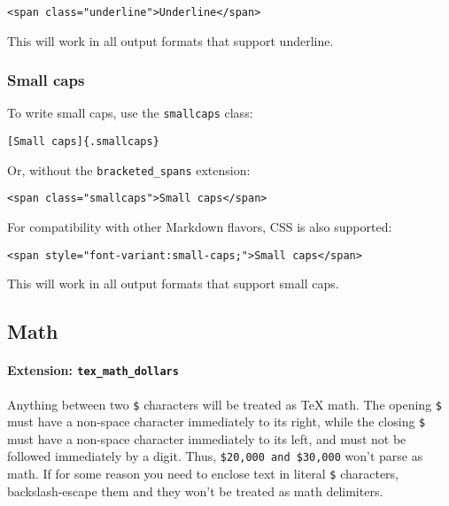 \begin{verbatim}
<span class="underline">Underline</span>
\end{verbatim}

This will work in all output formats that support underline.

\hypertarget{small-caps}{%
\subsubsection{Small caps}\label{small-caps}}

To write small caps, use the \texttt{smallcaps} class:

\begin{verbatim}
[Small caps]{.smallcaps}
\end{verbatim}

Or, without the \texttt{bracketed\_spans} extension:

\begin{verbatim}
<span class="smallcaps">Small caps</span>
\end{verbatim}

For compatibility with other Markdown flavors, CSS is also supported:

\begin{verbatim}
<span style="font-variant:small-caps;">Small caps</span>
\end{verbatim}

This will work in all output formats that support small caps.

\hypertarget{math}{%
\subsection{Math}\label{math}}

\hypertarget{extension-tex_math_dollars}{%
\paragraph{\texorpdfstring{Extension:
\texttt{tex\_math\_dollars}}{Extension: tex\_math\_dollars}}\label{extension-tex_math_dollars}}

Anything between two \texttt{\$} characters will be treated as TeX math.
The opening \texttt{\$} must have a non-space character immediately to
its right, while the closing \texttt{\$} must have a non-space character
immediately to its left, and must not be followed immediately by a
digit. Thus, \texttt{\$20,000\ and\ \$30,000} won't parse as math. If
for some reason you need to enclose text in literal \texttt{\$}
characters, backslash-escape them and they won't be treated as math
delimiters.

